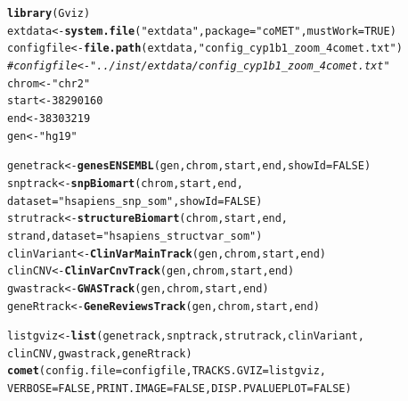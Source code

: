 \documentclass[11pt]{article}\usepackage[]{graphicx}\usepackage[usenames,dvipsnames]{color}
\makeatletter
\newcommand{\hlnum}[1]{\textcolor[rgb]{0.686,0.059,0.569}{#1}}%
\newcommand{\hlstr}[1]{\textcolor[rgb]{0.192,0.494,0.8}{#1}}%
\newcommand{\hlcom}[1]{\textcolor[rgb]{0.678,0.584,0.686}{\textit{#1}}}%
\newcommand{\hlstd}[1]{\textcolor[rgb]{0.345,0.345,0.345}{#1}}%
\newcommand{\hlkwb}[1]{\textcolor[rgb]{0.69,0.353,0.396}{#1}}%
\newcommand{\hlkwc}[1]{\textcolor[rgb]{0.333,0.667,0.333}{#1}}%
\newcommand{\hlkwd}[1]{\textcolor[rgb]{0.737,0.353,0.396}{\textbf{#1}}}%
\newenvironment{kframe}{%
 \def\at@end@of@kframe{}%
 \ifinner\ifhmode%
  \def\at@end@of@kframe{\end{minipage}}%
  \begin{minipage}{\columnwidth}%
 \fi\fi%
 \def\FrameCommand##1{\hskip\@totalleftmargin \hskip-\fboxsep
 \colorbox{shadecolor}{##1}\hskip-\fboxsep
     \hskip-\linewidth \hskip-\@totalleftmargin \hskip\columnwidth}%
 \MakeFramed {\advance\hsize-\width
   \@totalleftmargin\z@ \linewidth\hsize
   \@setminipage}}%
 {\par\unskip\endMakeFramed%
 \at@end@of@kframe}
\newenvironment{knitrout}{}{} %
\makeatother
\begin{document}
\begin{knitrout}
\color{fgcolor}\begin{kframe}
\begin{alltt}
\hlkwd{library}\hlstd{(Gviz)}
\hlstd{extdata} \hlkwb{<-} \hlkwd{system.file}\hlstd{(}\hlstr{"extdata"}\hlstd{,} \hlkwc{package}\hlstd{=}\hlstr{"coMET"}\hlstd{,}\hlkwc{mustWork}\hlstd{=}\hlnum{TRUE}\hlstd{)}
\hlstd{configfile} \hlkwb{<-} \hlkwd{file.path}\hlstd{(extdata,} \hlstr{"config_cyp1b1_zoom_4comet.txt"}\hlstd{)}
\hlcom{#configfile <- "../inst/extdata/config_cyp1b1_zoom_4comet.txt" }
\hlstd{chrom} \hlkwb{<-} \hlstr{"chr2"}
\hlstd{start} \hlkwb{<-} \hlnum{38290160}
\hlstd{end} \hlkwb{<-} \hlnum{38303219}
\hlstd{gen} \hlkwb{<-} \hlstr{"hg19"}

\hlstd{genetrack} \hlkwb{<-}\hlkwd{genesENSEMBL}\hlstd{(gen,chrom,start,end,}\hlkwc{showId}\hlstd{=}\hlnum{FALSE}\hlstd{)}
\hlstd{snptrack} \hlkwb{<-} \hlkwd{snpBiomart}\hlstd{(chrom, start, end,}
                       \hlkwc{dataset}\hlstd{=}\hlstr{"hsapiens_snp_som"}\hlstd{,}\hlkwc{showId}\hlstd{=}\hlnum{FALSE}\hlstd{)}
\hlstd{strutrack} \hlkwb{<-} \hlkwd{structureBiomart}\hlstd{(chrom, start, end,}
                              \hlstd{strand,} \hlkwc{dataset}\hlstd{=}\hlstr{"hsapiens_structvar_som"}\hlstd{)}
\hlstd{clinVariant}\hlkwb{<-}\hlkwd{ClinVarMainTrack}\hlstd{(gen,chrom,start,end)}
\hlstd{clinCNV}\hlkwb{<-}\hlkwd{ClinVarCnvTrack}\hlstd{(gen,chrom,start,end)}
\hlstd{gwastrack} \hlkwb{<-}\hlkwd{GWASTrack}\hlstd{(gen,chrom,start,end)}
\hlstd{geneRtrack} \hlkwb{<-}\hlkwd{GeneReviewsTrack}\hlstd{(gen,chrom,start,end)}

\hlstd{listgviz} \hlkwb{<-} \hlkwd{list}\hlstd{(genetrack,snptrack,strutrack,clinVariant,}
                 \hlstd{clinCNV,gwastrack,geneRtrack)}
\hlkwd{comet}\hlstd{(}\hlkwc{config.file}\hlstd{=configfile,}\hlkwc{TRACKS.GVIZ}\hlstd{=listgviz,}
      \hlkwc{VERBOSE}\hlstd{=}\hlnum{FALSE}\hlstd{,} \hlkwc{PRINT.IMAGE}\hlstd{=}\hlnum{FALSE}\hlstd{,}\hlkwc{DISP.PVALUEPLOT}\hlstd{=}\hlnum{FALSE}\hlstd{)}
\end{alltt}
\end{kframe}
\end{knitrout}
\end{document}
